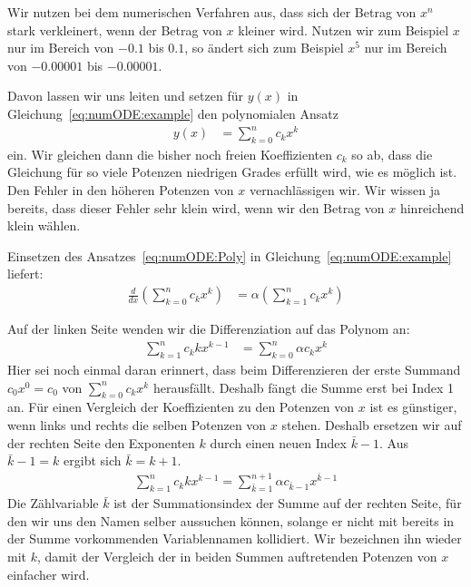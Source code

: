 \documentclass{article}
\let\l\left\let\r\right\let\cs\csname\let\ecs\endcsname\let\ea\expandafter
\def\ddx#1{\frac{d#1}{dx}}
\begin{document}
Wir nutzen bei dem numerischen Verfahren aus, dass sich der Betrag von
$x^n$ stark verkleinert, wenn der Betrag von $x$ kleiner wird. Nutzen
wir zum Beispiel $x$ nur im Bereich von $-0.1$ bis $0.1$, so ändert
sich zum Beispiel $x^5$ nur im Bereich von $-0.00001$ bis $-0.00001$.

Davon lassen wir uns leiten und setzen für $y(x)$ in Gleichung~\eqref{eq:numODE:example} den polynomialen Ansatz
\begin{align}
  y(x) &= \sum_{k=0}^n c_k x^k
         \label{eq:numODE:Poly}
\end{align}
ein. Wir gleichen dann die bisher noch freien Koeffizienten $c_k$ so
ab, dass die Gleichung für so viele Potenzen niedrigen Grades erfüllt
wird, wie es möglich ist. Den Fehler in den höheren Potenzen von $x$
vernachlässigen wir. Wir wissen ja bereits, dass dieser Fehler sehr
klein wird, wenn wir den Betrag von $x$ hinreichend klein wählen.

Einsetzen des Ansatzes~\eqref{eq:numODE:Poly} in Gleichung~\eqref{eq:numODE:example} liefert:
\begin{align*}
  \ddx{}\l(\sum_{k=0}^n c_k x^k\r) &=\alpha\l(\sum_{k=1}^n c_k x^k\r)
\end{align*}

Auf der linken Seite wenden wir die Differenziation auf das Polynom an:
\begin{align*}
  \sum_{k=1}^n c_k k x^{k-1} &= \sum_{k=0}^n  \alpha c_k x^k
\end{align*}
Hier sei noch einmal daran erinnert, dass beim Differenzieren der
erste Summand $c_0x^0=c_0$ von $\sum_{k=0}^n c_kx^k$
herausfällt. Deshalb fängt die Summe erst bei Index 1 an. Für einen
Vergleich der Koeffizienten zu den Potenzen von $x$ ist es günstiger,
wenn links und rechts die selben Potenzen von $x$ stehen. Deshalb
ersetzen wir auf der rechten Seite den Exponenten $k$ durch einen
neuen Index $\bar k-1$. Aus $\bar k-1 = k$ ergibt sich $\bar k=k+1$.
\begin{align*}
  \sum_{k = 1}^{n} c_k k x^{k-1} = \sum_{\bar k=1}^{n+1}  \alpha c_{\bar k-1} x^{\bar k-1}
\end{align*}
Die Zählvariable $\bar k$ ist der Summationsindex der Summe auf der
rechten Seite, für den wir uns den Namen selber aussuchen können,
solange er nicht mit bereits in der Summe vorkommenden Variablennamen
kollidiert. Wir bezeichnen ihn wieder mit $k$, damit der Vergleich der
in beiden Summen auftretenden Potenzen von $x$ einfacher wird.
\end{document}
